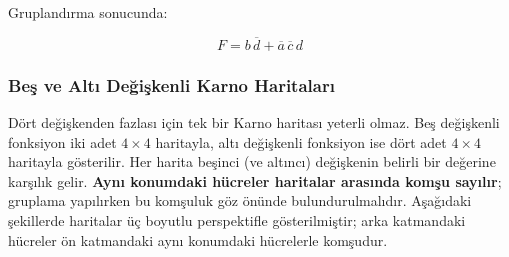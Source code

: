 \begin{ornek}[B.6]
Gruplandırma sonucunda:

\[
    F = b\,\overline{d} + \overline{a}\,\overline{c}\,d
\]
\end{ornek}

\subsubsection{Beş ve Altı Değişkenli Karno Haritaları}

Dört değişkenden fazlası için tek bir Karno haritası yeterli olmaz. Beş değişkenli fonksiyon iki adet $4 \times 4$ haritayla, altı değişkenli fonksiyon ise dört adet $4 \times 4$ haritayla gösterilir. Her harita beşinci (ve altıncı) değişkenin belirli bir değerine karşılık gelir. \textbf{Aynı konumdaki hücreler haritalar arasında komşu sayılır}; gruplama yapılırken bu komşuluk göz önünde bulundurulmalıdır. Aşağıdaki şekillerde haritalar üç boyutlu perspektifle gösterilmiştir; arka katmandaki hücreler ön katmandaki aynı konumdaki hücrelerle komşudur.

